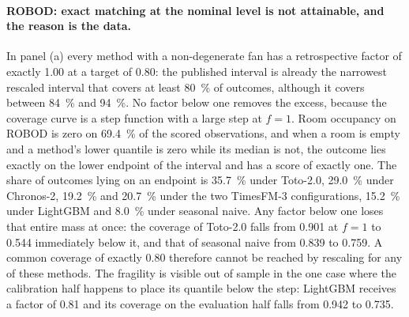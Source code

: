 \documentclass[utf8]{FrontiersinHarvard}
\newif\ifsecondrevisionmarkup
\newcommand{\rev}[1]{\ifsecondrevisionmarkup\textcolor{revisiontwo}{#1}\else#1\fi}
\theoremstyle{plain}
\theoremstyle{definition}
\theoremstyle{remark}
\begin{document}
\rev{\paragraph{ROBOD: exact matching at the nominal level is not attainable, and the reason is the data.} In panel (a) every method with a non-degenerate fan has a retrospective factor of exactly \num{1.00} at a target of \num{0.80}: the published interval is already the narrowest rescaled interval that covers at least \SI{80}{\percent} of outcomes, although it covers between \SI{84}{\percent} and \SI{94}{\percent}. No factor below one removes the excess, because the coverage curve is a step function with a large step at $f=1$. Room occupancy on ROBOD is zero on \SI{69.4}{\percent} of the scored observations, and when a room is empty and a method's lower quantile is zero while its median is not, the outcome lies exactly on the lower endpoint of the interval and has a score of exactly one. The share of outcomes lying on an endpoint is \SI{35.7}{\percent} under Toto-2.0, \SI{29.0}{\percent} under Chronos-2, \SI{19.2}{\percent} and \SI{20.7}{\percent} under the two TimesFM-3 configurations, \SI{15.2}{\percent} under LightGBM and \SI{8.0}{\percent} under seasonal naive. Any factor below one loses that entire mass at once: the coverage of Toto-2.0 falls from \num{0.901} at $f=1$ to \num{0.544} immediately below it, and that of seasonal naive from \num{0.839} to \num{0.759}. A common coverage of exactly \num{0.80} therefore cannot be reached by rescaling for any of these methods. The fragility is visible out of sample in the one case where the calibration half happens to place its quantile below the step: LightGBM receives a factor of \num{0.81} and its coverage on the evaluation half falls from \num{0.942} to \num{0.735}.}
\end{document}
